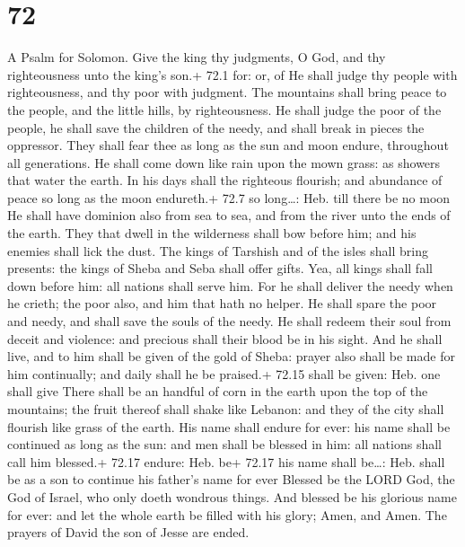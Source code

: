 \hypertarget{section-71}{%
\section{72}\label{section-71}}

A Psalm for Solomon.  Give the king thy judgments, O God,
and thy righteousness unto the king's son.+ 72.1 for: or, of
 He shall judge thy people with righteousness, and thy poor
with judgment.  The mountains shall bring peace to the
people, and the little hills, by righteousness.  He shall
judge the poor of the people, he shall save the children of the needy,
and shall break in pieces the oppressor.  They shall fear
thee as long as the sun and moon endure, throughout all generations.
 He shall come down like rain upon the mown grass: as
showers that water the earth.  In his days shall the
righteous flourish; and abundance of peace so long as the moon
endureth.+ 72.7 so long\ldots: Heb. till there be no moon 
He shall have dominion also from sea to sea, and from the river unto the
ends of the earth.  They that dwell in the wilderness shall
bow before him; and his enemies shall lick the dust.  The
kings of Tarshish and of the isles shall bring presents: the kings of
Sheba and Seba shall offer gifts.  Yea, all kings shall
fall down before him: all nations shall serve him.  For he
shall deliver the needy when he crieth; the poor also, and him that hath
no helper.  He shall spare the poor and needy, and shall
save the souls of the needy.  He shall redeem their soul
from deceit and violence: and precious shall their blood be in his
sight.  And he shall live, and to him shall be given of the
gold of Sheba: prayer also shall be made for him continually; and daily
shall he be praised.+ 72.15 shall be given: Heb. one shall give
 There shall be an handful of corn in the earth upon the
top of the mountains; the fruit thereof shall shake like Lebanon: and
they of the city shall flourish like grass of the earth. 
His name shall endure for ever: his name shall be continued as long as
the sun: and men shall be blessed in him: all nations shall call him
blessed.+ 72.17 endure: Heb. be+ 72.17 his name shall be\ldots: Heb.
shall be as a son to continue his father's name for ever 
Blessed be the LORD God, the God of Israel, who only doeth wondrous
things.  And blessed be his glorious name for ever: and let
the whole earth be filled with his glory; Amen, and Amen. 
The prayers of David the son of Jesse are ended.

